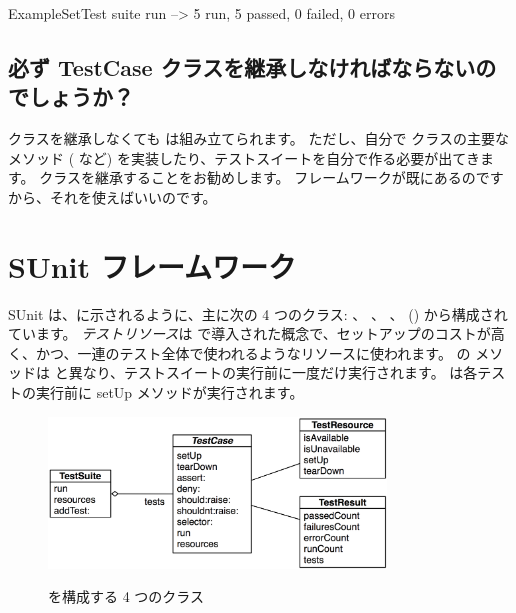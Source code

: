 \documentclass[a4paper,10pt,twoside]{book}
\begin{document}
\begin{code}{}
ExampleSetTest suite run --> 5 run, 5 passed, 0 failed, 0 errors
\end{code}

\subsection{必ず TestCase クラスを継承しなければならないのでしょうか？}

 クラスを継承しなくても  は組み立てられます。
ただし、自分で  クラスの主要なメソッド ( など) を実装したり、テストスイートを自分で作る必要が出てきます。
 クラスを継承することをお勧めします。
フレームワークが既にあるのですから、それを使えばいいのです。


\section{SUnit フレームワーク}

SUnit は、に示されるように、主に次の 4 つのクラス:  、
 、  、  () から構成されています。
\emph{テストリソース}は  で導入された概念で、セットアップのコストが高く、かつ、一連のテスト全体で使われるようなリソースに使われます。
 の  メソッドは  と異なり、テストスイートの実行前に一度だけ実行されます。  は各テストの実行前に setUp メソッドが実行されます。

\begin{figure}[htb]
  \begin{center}
		{\includegraphics[width=0.8\textwidth]{sunit-classes}}
	\caption{\SUnit を構成する 4 つのクラス}
  \end{center}
\end{figure}
\end{document}
